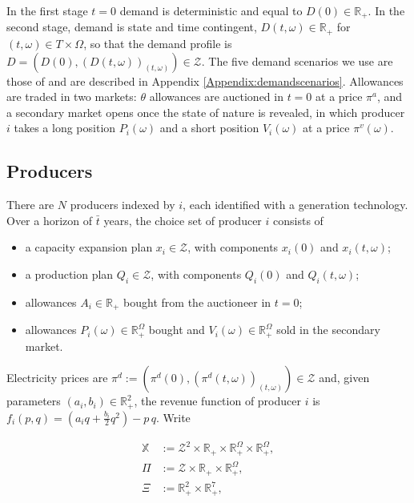 \documentclass[a4paper,fleqn]{cas-dc}
\begin{document}
In the first stage $t=0$ demand is deterministic and equal to $D(0)\in\mathbb{R}_+$. In the second stage, demand is state and time contingent, $D(t,\omega)\in\mathbb{R}_+$ for $(t,\omega)\in T\times\Omega$, so that the demand profile is $D=\left(D(0),(D(t,\omega))_{(t,\omega)}\right)\in\mathcal{Z}$.
The five demand scenarios we use are those of \citet{amigo_two_2021} and are described in Appendix \ref{Appendix:demandscenarios}. Allowances are traded in two markets: $\theta$ allowances are auctioned in $t=0$ at a price $\pi^a$, and a secondary market opens once the state of nature is revealed, in which producer $i$ takes a long position $P_i(\omega)$ and a short position $V_i(\omega)$ at a price $\pi^v(\omega)$.

\subsection{Producers}\label{subsec:producers}

There are $N$ producers indexed by $i$, each identified with a generation technology. Over a horizon of $\bar t$ years, the choice set of producer $i$ consists of

\begin{itemize}
\item a capacity expansion plan $x_i\in\mathcal{Z}$, with components $x_i(0)$ and $x_i(t,\omega)$;
\item a production plan $Q_i\in\mathcal{Z}$, with components $Q_i(0)$ and $Q_i(t,\omega)$;
\item allowances $A_i\in\mathbb{R}_+$ bought from the auctioneer in $t=0$;
\item allowances $P_i(\omega)\in\mathbb{R}_+^{\Omega}$ bought and $V_i(\omega)\in\mathbb{R}_+^{\Omega}$ sold in the secondary market.
\end{itemize}

Electricity prices are $\pi^d:=\left(\pi^d(0),(\pi^d(t,\omega))_{(t,\omega)}\right)\in\mathcal{Z}$ and, given parameters $(a_i,b_i)\in\mathbb{R}^2_+$, the revenue function of producer $i$ is $f_i(p,q)=\left(a_i q+\frac{b_i}{2}q^2\right)-p\,q$. Write

\begin{align}
\mathbb{X} &:= \mathcal{Z}^2\times\mathbb{R}_+\times\mathbb{R}_+^{\Omega}\times\mathbb{R}_+^{\Omega}, \label{set:X}\\
\Pi &:= \mathcal{Z}\times\mathbb{R}_+\times\mathbb{R}_+^{\Omega}, \label{set:Pi}\\
\Xi &:= \mathbb{R}_+^2\times\mathbb{R}_+^7 , \label{set:Xi}
\end{align}
\end{document}
